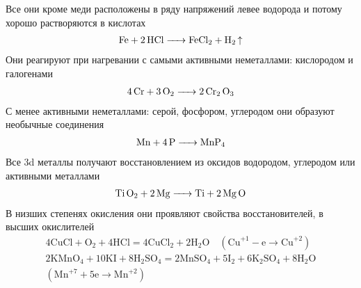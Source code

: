 Все они кроме меди расположены в ряду напряжений левее водорода  и потому хорошо растворяются в кислотах 
\begin{align*}
\ce{Fe  + 2 HCl -> FeCl_2 + H_2 \uparrow}
\end{align*}
Они реагируют при нагревании с самыми активными неметаллами: кислородом и галогенами
\begin{align*}
\ce{4Cr +3O_2 -> 2 Cr_2 O_3}
\end{align*}
С менее активными неметаллами: серой, фосфором, углеродом они образуют необычные соединения
\begin{align*}
\ce{Mn + 4P -> MnP_4}
\end{align*}
Все 3d металлы получают восстановлением из оксидов водородом, углеродом или активными металлами
\begin{align*}
\ce{Ti  O_2 + 2Mg -> Ti + 2Mg O}
\end{align*}
В низших степенях окисления они проявляют свойства восстановителей, в высших окислителей
\begin{align*}
4 \mathrm{CuCl}+\mathrm{O}_{2}+4 \mathrm{HCl}=4 \mathrm{CuCl}_{2}+2 \mathrm{H}_{2} \mathrm{O} \quad\left(\mathrm{Cu}^{+1}-\mathrm{e} \rightarrow \mathrm{Cu}^{+2}\right)\\
2 \mathrm{KMnO}_{4}+10 \mathrm{KI}+8 \mathrm{H}_{2} \mathrm{SO}_{4}=2 \mathrm{MnSO}_{4}+5 \mathrm{I}_{2}+6 \mathrm{K}_{2} \mathrm{SO}_{4}+8 \mathrm{H}_{2} \mathrm{O} \\
\left(\mathrm{Mn}^{+7}+5 \mathrm{e} \rightarrow \mathrm{Mn}^{+2}\right)	
\end{align*}
